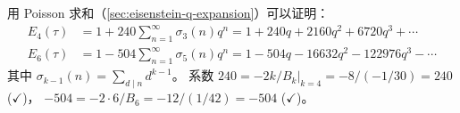 \begin{example}[$E_4, E_6$ 的展开（预告）]
\label{ex:E4-E6-expansion}
用 Poisson 求和（\cref{sec:eisenstein-q-expansion}）可以证明：
\begin{align*}
  E_4(\tau) &= 1 + 240\sum_{n=1}^{\infty} \sigma_3(n) q^n
  = 1 + 240q + 2160q^2 + 6720q^3 + \cdots \\
  E_6(\tau) &= 1 - 504\sum_{n=1}^{\infty} \sigma_5(n) q^n
  = 1 - 504q - 16632q^2 - 122976q^3 - \cdots
\end{align*}
其中 $\sigma_{k-1}(n) = \sum_{d \mid n} d^{k-1}$。
系数 $240 = -2k/B_k|_{k=4} = -8/(-1/30) = 240$ ($\checkmark$)，
$-504 = -2 \cdot 6 / B_6 = -12 / (1/42) = -504$ ($\checkmark$)。
\end{example}




